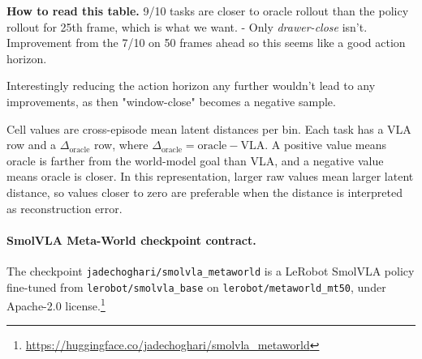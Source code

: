 \documentclass{article}
\begin{document}
\par\vspace{0.3em}
\noindent\small\textbf{How to read this table.} 9/10 tasks are closer to oracle rollout than the policy rollout for 25th frame, which is what we want. 
- Only \textit{drawer-close} isn't.
Improvement from the 7/10 on 50 frames ahead so this seems like a good action horizon.

Interestingly reducing the action horizon any further wouldn't lead to any improvements, as then "window-close" becomes a negative sample.

Cell values are cross-episode mean latent distances per bin. Each task has a VLA row and a \(\Delta_{\mathrm{oracle}}\) row, where \(\Delta_{\mathrm{oracle}} = \mathrm{oracle} - \mathrm{VLA}\). A positive value means oracle is farther from the world-model goal than VLA, and a negative value means oracle is closer. In this representation, larger raw values mean larger latent distance, so values closer to zero are preferable when the distance is interpreted as reconstruction error.














\paragraph{SmolVLA Meta-World checkpoint contract.}
The checkpoint \texttt{jadechoghari/smolvla\_metaworld} is a LeRobot SmolVLA policy fine-tuned from \texttt{lerobot/smolvla\_base} on \texttt{lerobot/metaworld\_mt50}, under Apache-2.0 license.\footnote{\url{https://huggingface.co/jadechoghari/smolvla_metaworld}}  
\end{document}

